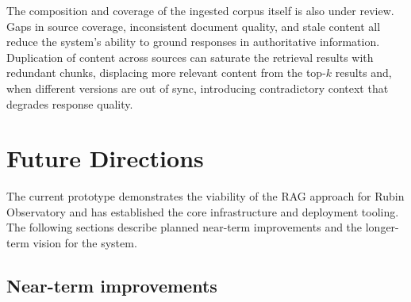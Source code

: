 The composition and coverage of the ingested corpus itself is also under review.
Gaps in source coverage, inconsistent document quality, and stale content all reduce the system's ability to ground responses in authoritative information.
Duplication of content across sources can saturate the retrieval results with redundant chunks, displacing more relevant content from the top-$k$ results and, when different versions are out of sync, introducing contradictory context that degrades response quality.
 
\section{Future Directions}
\label{sec:future}
 
The current prototype demonstrates the viability of the \gls{RAG} approach for Rubin Observatory and has established the core infrastructure and deployment tooling.
The following sections describe planned near-term improvements and the longer-term vision for the system.
 
\subsection{Near-term improvements}
\label{sec:nearterm}
 
